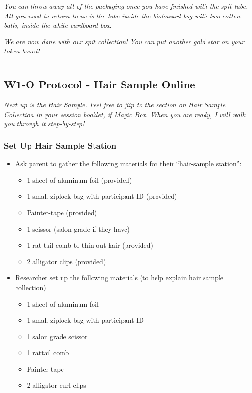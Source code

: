 \documentclass[
]{book}
\providecommand{\tightlist}{%
  \setlength{\itemsep}{0pt}\setlength{\parskip}{0pt}}
\begin{document}
\emph{You can throw away all of the packaging once you have finished with the spit tube. All you need to return to us is the tube inside the biohazard bag with two cotton balls, inside the white cardboard box.}

\emph{We are now done with our spit collection! You can put another gold star on your token board!}

\begin{center}\rule{0.5\linewidth}{0.5pt}\end{center}

\hypertarget{w1-o-protocol---hair-sample-online}{%
\subsection{W1-O Protocol - Hair Sample Online}\label{w1-o-protocol---hair-sample-online}}

\emph{Next up is the Hair Sample. Feel free to flip to the section on Hair Sample Collection in your session booklet, if Magic Box. When you are ready, I will walk you through it step-by-step!}

\hypertarget{set-up-hair-sample-station-1}{%
\subsubsection{Set Up Hair Sample Station}\label{set-up-hair-sample-station-1}}

\begin{itemize}
\tightlist
\item
  Ask parent to gather the following materials for their ``hair-sample station'':

  \begin{itemize}
  \tightlist
  \item
    1 sheet of aluminum foil (provided)
  \item
    1 small ziplock bag with participant ID (provided)
  \item
    Painter-tape (provided)
  \item
    1 scissor (salon grade if they have)
  \item
    1 rat-tail comb to thin out hair (provided)
  \item
    2 alligator clips (provided)
  \end{itemize}
\item
  Researcher set up the following materials (to help explain hair sample collection):

  \begin{itemize}
  \tightlist
  \item
    1 sheet of aluminum foil
  \item
    1 small ziplock bag with participant ID
  \item
    1 salon grade scissor
  \item
    1 rattail comb
  \item
    Painter-tape
  \item
    2 alligator curl clips
  \end{itemize}
\end{itemize}
\end{document}
